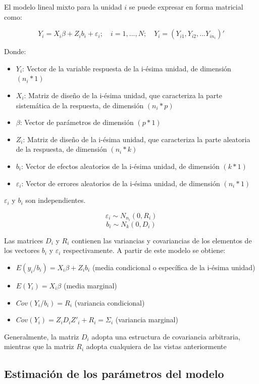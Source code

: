 \documentclass[spanish]{article}
\numberwithin{figure}{subsection}
\numberwithin{equation}{subsection}
\numberwithin{table}{subsection}
\begin{document}
El modelo lineal mixto para la unidad $i$ se puede expresar en forma matricial
como:

\[ Y_i = X_i\beta + Z_ib_i + \varepsilon_i; \quad i = 1, ..., N;
\quad Y_i = (Y_{i1}, Y_{i2}, ... Y_{in_{i}})' \]

Donde:

\begin{itemize}
	\item $Y_i$: Vector de la variable respuesta de la i-ésima unidad, de
	dimensión $(n_i*1)$
	\item $X_i$: Matriz de diseño de la i-ésima unidad, que caracteriza la
	parte sistemática de la respuesta, de dimensión $(n_i*p)$
	\item $\beta$: Vector de parámetros de dimensión $(p*1)$
	\item $Z_i$: Matriz de diseño de la i-ésima unidad, que caracteriza la
	parte aleatoria de la respuesta, de dimensión $(n_i*k)$
	\item $b_i$: Vector de efectos aleatorios de la i-ésima unidad, de
	dimensión $(k*1)$
	\item $\varepsilon_i$: Vector de errores aleatorios de la i-ésima unidad,
	de dimensión $(n_i*1)$
\end{itemize}

$\varepsilon_i$ y $b_i$ son independientes.

\[ \varepsilon_i \sim N_{n_i}(0, R_i) \]
\[ b_i \sim N_k(0, D_i) \]

Las matrices $D_i$ y $R_i$ contienen las variancias y covariancias de los
elementos de los vectores $b_i$ y $\varepsilon_i$ respectivamente. A partir de
este modelo se obtiene:

\begin{itemize}
	\item $E(y_i/b_i) = X_i\beta + Z_ib_i$ (media condicional o específica de
	la i-ésima unidad)
	\item $E(Y_i) = X_i\beta$ (media marginal)
	\item $Cov(Y_i/b_i) = R_i$ (variancia condicional)
	\item $Cov(Y_i) = Z_iD_iZ'_i + R_i = \varSigma_i$ (variancia marginal)
\end{itemize}

Generalmente, la matriz $D_i$ adopta una estructura de covariancia arbitraria,
mientras que la matriz $R_i$ adopta cualquiera de las vistas anteriormente

\subsection{Estimación de los parámetros del modelo}
\end{document}
